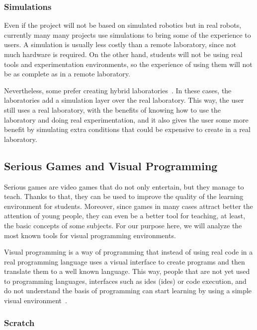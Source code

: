 \subsubsection{Simulations}

Even if the project will not be based on simulated robotics but in real robots, currently many
many projects use simulations to bring some of the experience to users. A simulation is usually
less costly than a remote laboratory, since not much hardware is required. On the other hand,
students will not be using real tools and experimentation environments, so the experience of using
them will not be as complete as in a remote laboratory.

Nevertheless, some prefer creating hybrid laboratories~\cite{hybrid_labs}. In these cases, the
laboratories add a simulation layer over the real laboratory. This way, the user still uses a real
laboratory, with the benefits of knowing how to use the laboratory and doing real experimentation,
and it also gives the user some more benefit by simulating extra conditions that could be expensive
to create in a real laboratory.

\subsection{Serious Games and Visual Programming}

Serious games are video games that do not only entertain, but they manage to teach. Thanks to that,
they can be used to improve the quality of the learning environment for students. Moreover, since
games in many cases attract better the attention of young people, they can even be a better tool for
teaching, at least, the basic concepts of some subjects. For our purpose here, we will analyze the
most known tools for visual programming environments.

Visual programming is a way of programming that instead of using real code in a real programming
language uses a visual interface to create programs and then translate them to a well known
language. This way, people that are not yet used to programming languages, interfaces such as
\acrshort{ide}s (\acrlong{ide}s) or code execution, and do not understand the basis of programming
can start learning by using a simple visual environment~\cite{visual_programming}.

\subsubsection{Scratch}

